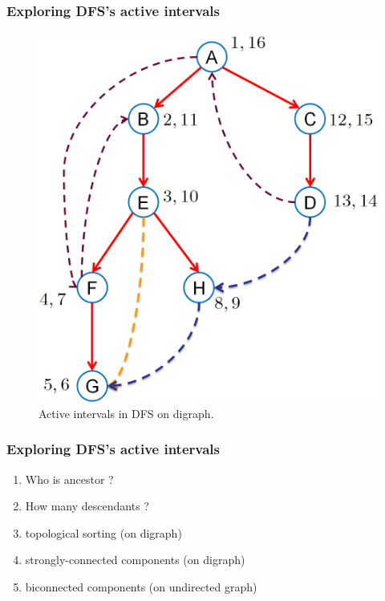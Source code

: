 \begin{frame}
  \frametitle{Exploring DFS's active intervals}

    \begin{figure}
      \includegraphics[scale=0.40]{figure/bfs_dfs/activeinterval}
      \caption{{\scriptsize Active intervals in DFS on digraph.}}
      \label{fig:activeinterval}
    \end{figure}

\end{frame}


\begin{frame}
  \frametitle{Exploring DFS's active intervals}

  \begin{enumerate}
    \item Who is ancestor ?
    \item How many descendants ?
      \pause
    \item topological sorting (on digraph)
    \item strongly-connected components (on digraph)
    \item biconnected components (on undirected graph)
  \end{enumerate}

\end{frame}



